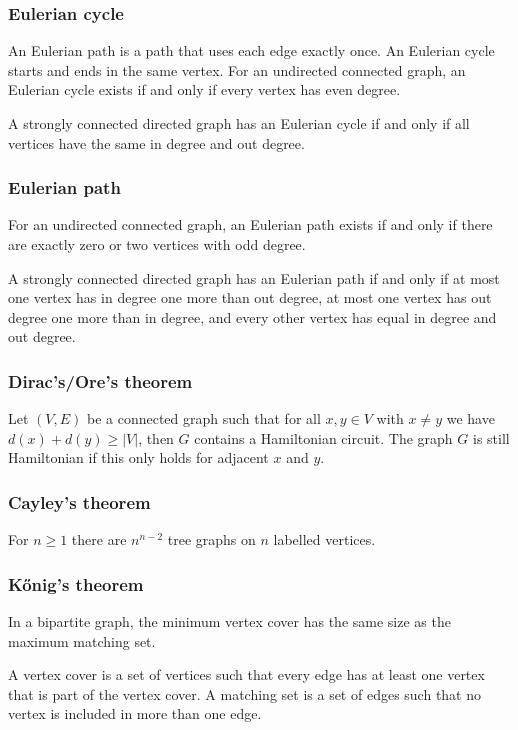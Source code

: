 \subsubsection{Eulerian cycle}
An Eulerian path is a path that uses each edge exactly once. An Eulerian cycle starts and ends in the same vertex. For an undirected connected graph, an Eulerian cycle exists if and only if every vertex has even degree.

A strongly connected directed graph has an Eulerian cycle if and only if all vertices have the same in degree and out degree.

\subsubsection{Eulerian path}
For an undirected connected graph, an Eulerian path exists if and only if there are exactly zero or two vertices with odd degree.

A strongly connected directed graph has an Eulerian path if and only if at most one vertex has in degree one more than out degree, at most one vertex has out degree one more than in degree, and every other vertex has equal in degree and out degree.

\subsubsection{Dirac's/Ore's theorem}
Let $(V, E)$ be a connected graph such that for all $x, y \in V$ with $x \neq y$ we have $d(x) + d(y) \geq |V|$, then $G$ contains a Hamiltonian circuit. The graph $G$ is still Hamiltonian if this only holds for adjacent $x$ and $y$.

\subsubsection{Cayley's theorem}
For $n \geq 1$ there are $n^{n-2}$ tree graphs on $n$ labelled vertices.

\subsubsection{Kőnig's theorem}
In a bipartite graph, the minimum vertex cover has the same size as the maximum matching set.

A vertex cover is a set of vertices such that every edge has at least one vertex that is part of the vertex cover. A matching set is a set of edges such that no vertex is included in more than one edge.

